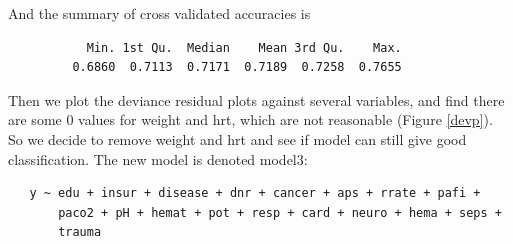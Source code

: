 \documentclass{article}
\begin{document}
And the summary of cross validated accuracies is
\begin{verbatim}
           Min. 1st Qu.  Median    Mean 3rd Qu.    Max. 
         0.6860  0.7113  0.7171  0.7189  0.7258  0.7655 
\end{verbatim}

Then we plot the deviance residual plots against several variables, and find there are some 0 values for weight and hrt, which are not reasonable (Figure \ref{devp}). So we decide to remove weight and hrt and see if model can still give good classification. The new model is denoted model3:
\begin{verbatim}
   y ~ edu + insur + disease + dnr + cancer + aps + rrate + pafi + 
       paco2 + pH + hemat + pot + resp + card + neuro + hema + seps + 
       trauma
\end{verbatim}
\end{document}
